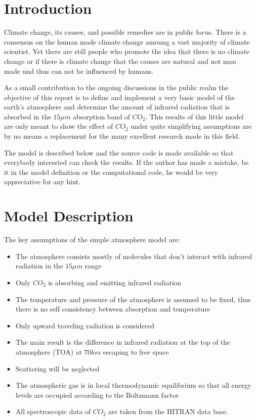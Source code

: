 \section{Introduction}

Climate change, its causes, and possible remedies are in public focus. There is a consensus on the human made climate change amoung a vast majority of climate scientist. Yet there are still people who promote the idea that there is no climate change or if there is climate change that the causes are natural and not man made und thus can not be influenced by humans. 

As a small contribution to the ongoing discussions in the public realm the objective of this report is to define and implement a very basic model of the earth's atmosphere and determine the amount of infrared radiation that is absorbed in the $15 \mu m$ absorption band of $CO_2$. This results of this little model are only meant to show the effect of $CO_2$ under quite simplifying assumptions are by no means a replacement for the many excellent research made in this field.    

The model is described below and the source code is made available so that everybody interested can check the results. If the author has made a mistake, be it in the model definition or the computational code, he would be very appreciative for any hint.


\section{Model Description}

The key assumptions of the simple atmosphere model are:
\begin{itemize}
	\item The atmosphere consists mostly of molecules that don't interact with infrared radiation in the $15 \mu m$ range
	\item Only $CO_2$ is absorbing and emitting infrared radiation
	\item The temperature and pressure of the atmosphere is assumed to be fixed, thus there is no self consistency between absorption and temperature
	\item Only upward traveling radiation is considered  
	\item The main result is the difference in infrared radiation at the top of the atmosphere (TOA) at $70 km$ escaping to free space 
	\item Scattering will be neglected
	\item The atmospheric  gas is in local thermodynamic equilibrium so that all energy levels are occupied according to 
	the Boltzmann factor
	\item All spectroscopic data of $CO_2$ are taken from the HITRAN data base. 
\end{itemize}


